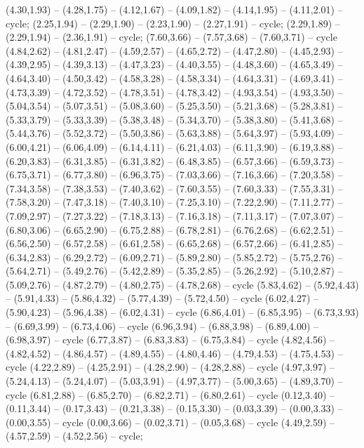 { (4.30,1.93) -- (4.28,1.75) -- (4.12,1.67) -- (4.09,1.82) -- (4.14,1.95) -- (4.11,2.01) -- cycle;
 (2.25,1.94) -- (2.29,1.90) -- (2.23,1.90) -- (2.27,1.91) -- cycle;
 (2.29,1.89) -- (2.29,1.94) -- (2.36,1.91) -- cycle;
 (7.60,3.66) -- (7.57,3.68) -- (7.60,3.71) -- cycle (4.84,2.62) -- (4.81,2.47) -- (4.59,2.57) -- (4.65,2.72) -- (4.47,2.80) -- (4.45,2.93) -- (4.39,2.95) -- (4.39,3.13) -- (4.47,3.23) -- (4.40,3.55) -- (4.48,3.60) -- (4.65,3.49) -- (4.64,3.40) -- (4.50,3.42) -- (4.58,3.28) -- (4.58,3.34) -- (4.64,3.31) -- (4.69,3.41) -- (4.73,3.39) -- (4.72,3.52) -- (4.78,3.51) -- (4.78,3.42) -- (4.93,3.54) -- (4.93,3.50) -- (5.04,3.54) -- (5.07,3.51) -- (5.08,3.60) -- (5.25,3.50) -- (5.21,3.68) -- (5.28,3.81) -- (5.33,3.79) -- (5.33,3.39) -- (5.38,3.48) -- (5.34,3.70) -- (5.38,3.80) -- (5.41,3.68) -- (5.44,3.76) -- (5.52,3.72) -- (5.50,3.86) -- (5.63,3.88) -- (5.64,3.97) -- (5.93,4.09) -- (6.00,4.21) -- (6.06,4.09) -- (6.14,4.11) -- (6.21,4.03) -- (6.11,3.90) -- (6.19,3.88) -- (6.20,3.83) -- (6.31,3.85) -- (6.31,3.82) -- (6.48,3.85) -- (6.57,3.66) -- (6.59,3.73) -- (6.75,3.71) -- (6.77,3.80) -- (6.96,3.75) -- (7.03,3.66) -- (7.16,3.66) -- (7.20,3.58) -- (7.34,3.58) -- (7.38,3.53) -- (7.40,3.62) -- (7.60,3.55) -- (7.60,3.33) -- (7.55,3.31) -- (7.58,3.20) -- (7.47,3.18) -- (7.40,3.10) -- (7.25,3.10) -- (7.22,2.90) -- (7.11,2.77) -- (7.09,2.97) -- (7.27,3.22) -- (7.18,3.13) -- (7.16,3.18) -- (7.11,3.17) -- (7.07,3.07) -- (6.80,3.06) -- (6.65,2.90) -- (6.75,2.88) -- (6.78,2.81) -- (6.76,2.68) -- (6.62,2.51) -- (6.56,2.50) -- (6.57,2.58) -- (6.61,2.58) -- (6.65,2.68) -- (6.57,2.66) -- (6.41,2.85) -- (6.34,2.83) -- (6.29,2.72) -- (6.09,2.71) -- (5.89,2.80) -- (5.85,2.72) -- (5.75,2.76) -- (5.64,2.71) -- (5.49,2.76) -- (5.42,2.89) -- (5.35,2.85) -- (5.26,2.92) -- (5.10,2.87) -- (5.09,2.76) -- (4.87,2.79) -- (4.80,2.75) -- (4.78,2.68) -- cycle (5.83,4.62) -- (5.92,4.43) -- (5.91,4.33) -- (5.86,4.32) -- (5.77,4.39) -- (5.72,4.50) -- cycle (6.02,4.27) -- (5.90,4.23) -- (5.96,4.38) -- (6.02,4.31) -- cycle (6.86,4.01) -- (6.85,3.95) -- (6.73,3.93) -- (6.69,3.99) -- (6.73,4.06) -- cycle (6.96,3.94) -- (6.88,3.98) -- (6.89,4.00) -- (6.98,3.97) -- cycle (6.77,3.87) -- (6.83,3.83) -- (6.75,3.84) -- cycle (4.82,4.56) -- (4.82,4.52) -- (4.86,4.57) -- (4.89,4.55) -- (4.80,4.46) -- (4.79,4.53) -- (4.75,4.53) -- cycle (4.22,2.89) -- (4.25,2.91) -- (4.28,2.90) -- (4.28,2.88) -- cycle (4.97,3.97) -- (5.24,4.13) -- (5.24,4.07) -- (5.03,3.91) -- (4.97,3.77) -- (5.00,3.65) -- (4.89,3.70) -- cycle (6.81,2.88) -- (6.85,2.70) -- (6.82,2.71) -- (6.80,2.61) -- cycle (0.12,3.40) -- (0.11,3.44) -- (0.17,3.43) -- (0.21,3.38) -- (0.15,3.30) -- (0.03,3.39) -- (0.00,3.33) -- (0.00,3.55) -- cycle (0.00,3.66) -- (0.02,3.71) -- (0.05,3.68) -- cycle (4.49,2.59) -- (4.57,2.59) -- (4.52,2.56) -- cycle;
}
